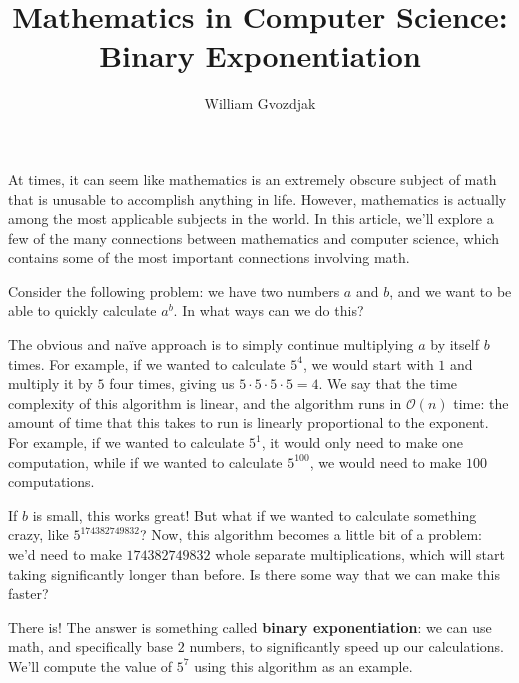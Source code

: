 \documentclass{article}
\title{Mathematics in Computer Science: Binary Exponentiation}
\author{William Gvozdjak}
\begin{document}
\maketitle
At times, it can seem like mathematics is an extremely obscure subject of math that is unusable to accomplish anything in life. However, mathematics is actually among the most applicable subjects in the world. In this article, we'll explore a few of the many connections between mathematics and computer science, which contains some of the most important connections involving math.

Consider the following problem: we have two numbers $a$ and $b$, and we want to be able to quickly calculate $a^b$. In what ways can we do this?

The obvious and na\"{i}ve approach is to simply continue multiplying $a$ by itself $b$ times. For example, if we wanted to calculate $5^4$, we would start with $1$ and multiply it by $5$ four times, giving us $5\cdot 5\cdot 5\cdot 5=4$. We say that the time complexity of this algorithm is linear, and the algorithm runs in $\mathcal{O}(n)$ time: the amount of time that this takes to run is linearly proportional to the exponent. For example, if we wanted to calculate $5^1$, it would only need to make one computation, while if we wanted to calculate $5^{100}$, we would need to make $100$ computations.

If $b$ is small, this works great! But what if we wanted to calculate something crazy, like $5^{174382749832}$? Now, this algorithm becomes a little bit of a problem: we'd need to make $174382749832$ whole separate multiplications, which will start taking significantly longer than before. Is there some way that we can make this faster?

There is! The answer is something called \textbf{binary exponentiation}: we can use math, and specifically base $2$ numbers, to significantly speed up our calculations. We'll compute the value of $5^{7}$ using this algorithm as an example.
\end{document}
